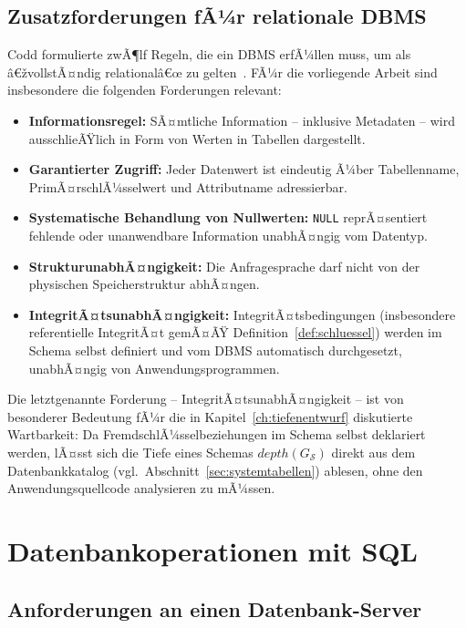 ﻿\documentclass[a4paper,12pt]{report}
\theoremstyle{definition}
\theoremstyle{remark}
\newcommand{\depth}{\mathit{depth}}
\begin{document}
\section{Zusatzforderungen fÃ¼r relationale DBMS}
\label{sec:codd-rules}

Codd formulierte zwÃ¶lf Regeln, die ein DBMS erfÃ¼llen muss, um als
â€žvollstÃ¤ndig relationalâ€œ zu gelten~\cite{Codd1970,Codd1974}. FÃ¼r die
vorliegende Arbeit sind insbesondere die folgenden Forderungen
relevant:

\begin{itemize}
  \item \textbf{Informationsregel:} SÃ¤mtliche Information -- inklusive
    Metadaten -- wird ausschlieÃŸlich in Form von Werten in Tabellen
    dargestellt.
  \item \textbf{Garantierter Zugriff:} Jeder Datenwert ist eindeutig
    Ã¼ber Tabellenname, PrimÃ¤rschlÃ¼sselwert und Attributname adressierbar.
  \item \textbf{Systematische Behandlung von Nullwerten:} \texttt{NULL}
    reprÃ¤sentiert fehlende oder unanwendbare Information unabhÃ¤ngig vom
    Datentyp.
  \item \textbf{StrukturunabhÃ¤ngigkeit:} Die Anfragesprache darf nicht
    von der physischen Speicherstruktur abhÃ¤ngen.
  \item \textbf{IntegritÃ¤tsunabhÃ¤ngigkeit:} IntegritÃ¤tsbedingungen
    (insbesondere referentielle IntegritÃ¤t gemÃ¤ÃŸ
    Definition~\ref{def:schluessel}) werden im Schema selbst definiert
    und vom DBMS automatisch durchgesetzt, unabhÃ¤ngig von
    Anwendungsprogrammen.
\end{itemize}

Die letztgenannte Forderung -- IntegritÃ¤tsunabhÃ¤ngigkeit -- ist von
besonderer Bedeutung fÃ¼r die in Kapitel~\ref{ch:tiefenentwurf}
diskutierte Wartbarkeit: Da FremdschlÃ¼sselbeziehungen im Schema selbst
deklariert werden, lÃ¤sst sich die Tiefe eines Schemas
$\depth(G_{\mathcal{S}})$ direkt aus dem Datenbankkatalog (vgl.\
Abschnitt~\ref{sec:systemtabellen}) ablesen, ohne den
Anwendungsquellcode analysieren zu mÃ¼ssen.

\chapter{Datenbankoperationen mit SQL}
\label{ch:sql}

\section{Anforderungen an einen Datenbank-Server}
\end{document}
